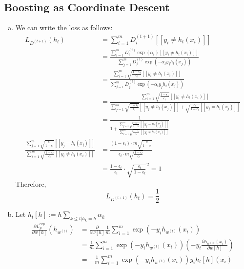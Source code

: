 \documentclass{amsart}
\theoremstyle{definition}
\begin{document}
\subsection{Boosting as Coordinate Descent}
\begin{enumerate}[(a)]
  \item 
    We can write the loss as follows:
    \begin{align*}
      L_{D^{(t+1)}}(h_t) &= \sum_{i = 1}^{m} D_i^{(t+1)} [[y_i \neq h_t(x_i)]]\\
      &= \frac{\sum_{i = 1}^{m} D_i^{(t)}\exp(\alpha_t)[[y_i \neq h_t(x_i)]]}{\sum_{j=1}^{m} D_j^{(t)}\exp(-\alpha_t y_j h_t(x_j))}\\
      &= \frac{\sum_{i=1}^{m} \sqrt{\frac{1 - \epsilon_t}{\epsilon_t}}[[y_i \neq h_t(x_i)]]}{\sum_{j=1}^{m} D_j^{(t)}\exp(-\alpha_t y_j h_t(x_j))}\\
      &= \frac{\sum_{i=1}^{m}\sqrt{\frac{1 - \epsilon_t}{\epsilon_t}}[[y_i \neq h_t(x_i)]]}{\sum_{j=1}^{m} \sqrt{\frac{1 - \epsilon_t}{\epsilon_t}}[[y_j \neq h_t(x_j)]] + \sqrt{\frac{\epsilon_t}{1 - \epsilon_t}}[[y_j = h_t(x_j)]]}\\
      &= \frac{1}{1 + \frac{\sum_{j=1}^{m} \sqrt{\frac{\epsilon_t}{1 - \epsilon_t}}[[y_j = h_t(x_j)]]}{\sum_{i = 1}^{m} \sqrt{\frac{1 - \epsilon_t}{\epsilon_t}}[[y_i \neq h_t(x_i)]]}}\\
      \frac{\sum_{j=1}^{m} \sqrt{\frac{\epsilon_t}{1 - \epsilon_t}}[[y_j = h_t(x_j)]]}{\sum_{i = 1}^{m} \sqrt{\frac{1 - \epsilon_t}{\epsilon_t}}[[y_i \neq h_t(x_i)]]} &= \frac{(1 - \epsilon_t) \cdot m \sqrt{\frac{\epsilon_t}{1 - \epsilon_t}}}{\epsilon_t \cdot m \sqrt{\frac{1 - \epsilon_t}{\epsilon_t}}}\\
      &= \frac{1-\epsilon_t}{\epsilon_t} \cdot \sqrt{\frac{\epsilon_t}{1 - \epsilon_t}}^2 = 1
    \end{align*}
    Therefore, 
    \[L_{D^{(t+1)}}(h_t) = \frac{1}{2}\]
  \item
    Let $h_t[h] := h\sum_{k \le t | h_k = h} \alpha_k$
    \begin{align*}
      \frac{\partial L_S^{exp}}{\partial w[h]}(h_{w^{(t)}}) &= \frac{\partial}{\partial w[h]} \frac{1}{m} \sum_{i = 1}^{m} \exp(-y_i h_{w^{(t)}}(x_i))\\
      &= \frac{1}{m} \sum_{i = 1}^{m} \exp(-y_i h_{w^{(t)}}(x_i)) \left(-y_i \frac{\partial h_{w^{(t)}}(x_i)}{\partial w[h]}\right)\\
      &= -\frac{1}{m} \sum_{i = 1}^{m} \exp(-y_i h_{w^{(t)}}(x_i))y_i h_t[h](x_i)\\

\end{align*}
\end{enumerate}
\end{document}
